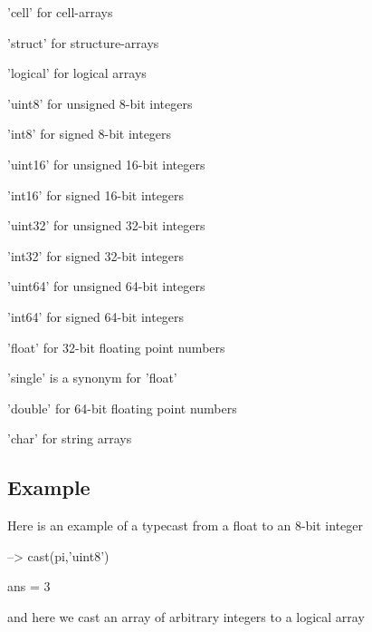 \begin{DoxyItemize}
\item {\ttfamily 'cell'} for cell-\/arrays  
\item {\ttfamily 'struct'} for structure-\/arrays  
\item {\ttfamily 'logical'} for logical arrays  
\item {\ttfamily 'uint8'} for unsigned 8-\/bit integers  
\item {\ttfamily 'int8'} for signed 8-\/bit integers  
\item {\ttfamily 'uint16'} for unsigned 16-\/bit integers  
\item {\ttfamily 'int16'} for signed 16-\/bit integers  
\item {\ttfamily 'uint32'} for unsigned 32-\/bit integers  
\item {\ttfamily 'int32'} for signed 32-\/bit integers  
\item {\ttfamily 'uint64'} for unsigned 64-\/bit integers  
\item {\ttfamily 'int64'} for signed 64-\/bit integers  
\item {\ttfamily 'float'} for 32-\/bit floating point numbers  
\item {\ttfamily 'single'} is a synonym for {\ttfamily 'float'}  
\item {\ttfamily 'double'} for 64-\/bit floating point numbers  
\item {\ttfamily 'char'} for string arrays  
\end{DoxyItemize}\hypertarget{variables_struct_Example}{}\subsection{Example}\label{variables_struct_Example}
Here is an example of a typecast from a float to an 8-\/bit integer


\begin{DoxyVerbInclude}
--> cast(pi,'uint8')

ans = 
 3 
\end{DoxyVerbInclude}


and here we cast an array of arbitrary integers to a logical array



